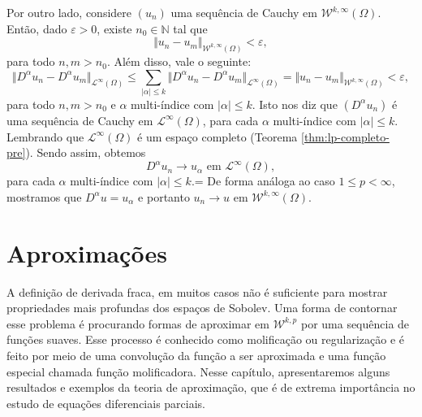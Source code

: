 \documentclass[a4paper, 11pt]{book}
\theoremstyle{definition}
\newcommand{\bN}{\mathbb{N}}
\newcommand{\cL}{\mathcal{L}}
\newcommand{\cW}{\mathcal{W}}
\begin{document}
\begin{prf}
    Por outro lado, considere $(u_n)$ uma sequência de Cauchy em $\cW^{k,\infty}(\Omega)$. Então, dado $\varepsilon > 0$, existe $n_0 \in \bN$ tal que
    \[
        \Vert u_n - u_m \Vert_{\cW^{k,\infty}(\Omega)} < \varepsilon,
    \]
    para todo $n,m > n_0$. Além disso, vale o seguinte:
    \[
        \Vert D^\alpha u_n - D^\alpha u_m \Vert_{\cL^\infty(\Omega)} \leqslant \sum_{|\alpha| \leqslant k} \Vert D^\alpha u_n - D^\alpha u_m \Vert_{\cL^\infty(\Omega)} = \Vert u_n - u_m \Vert_{\cW^{k,\infty}(\Omega)} < \varepsilon,
    \]
    para todo $n,m > n_0$ e $\alpha$ multi-índice com $|\alpha| \leqslant k$. Isto nos diz que $(D^\alpha u_n)$ é uma sequência de Cauchy em $\cL^\infty(\Omega)$, para cada $\alpha$ multi-índice com $|\alpha| \leqslant k$. Lembrando que $\cL^\infty(\Omega)$ é um espaço completo (Teorema \ref{thm:lp-completo-pre}). Sendo assim, obtemos
    \[
        D^{\alpha} u_n \to u_\alpha \text{ em } \cL^\infty(\Omega),
    \]
    para cada $\alpha$ multi-índice com $|\alpha| \leqslant k$.=
    De forma análoga ao caso $1 \leqslant p < \infty$, mostramos que $D^\alpha u = u_\alpha$ e portanto $u_n \to u$ em $\cW^{k,\infty}(\Omega)$.
\end{prf}

\section{Aproximações} \label{sec:aproximacoes}


A definição de derivada fraca, em muitos casos não é suficiente para mostrar propriedades mais profundas dos espaços de Sobolev.
Uma forma de contornar esse problema é procurando formas de aproximar em $\cW^{k,p}$ por uma sequência de funções suaves.
Esse processo é conhecido como molificação ou regularização e é feito por meio de uma convolução da função a ser aproximada e uma função especial chamada função molificadora. 
Nesse capítulo, apresentaremos alguns resultados e exemplos da teoria de aproximação, que é de extrema importância no estudo de equações diferenciais parciais.
\end{document}
